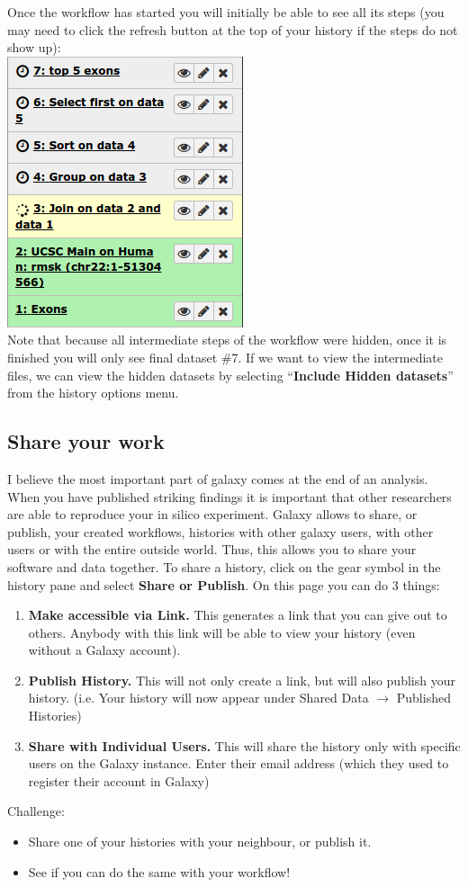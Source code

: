 \documentclass[11pt,a4paper]{article}
\begin{document}
Once the workflow has started you will initially be able to see all its steps (you may need to click the refresh button at the top of your history if the steps do not show up):\\
\includegraphics[scale=0.55]{figures/101_39}\\
Note that because all intermediate steps of the workflow were hidden, once it is finished you will only see final dataset \#7. If we want to view the intermediate files, we can view the hidden datasets by selecting ``\textbf{Include Hidden datasets}'' from the history options menu.
\subsection{Share your work}
I believe the most important part of galaxy comes at the end of an analysis. When you have published striking findings it is important that other researchers are able to reproduce your in silico experiment. Galaxy allows to share, or publish, your created workflows, histories with other galaxy users, with other users or with the entire outside world. Thus, this allows you to share your software and data together. To share a history, click on the gear symbol in the history pane and select \textbf{Share or Publish}. On this page you can do 3 things:
\begin{enumerate}
	\item \textbf{Make accessible via Link.} This generates a link that you can give out to others. Anybody with this link will be able to view your history (even without a Galaxy account).
	\item \textbf{Publish History.} This will not only create a link, but will also publish your history. (i.e. Your history will now appear
 under Shared Data $\rightarrow$ Published Histories)
	\item \textbf{Share with Individual Users.} This will share the history only with specific users on the Galaxy instance. Enter their email address (which they used to register their account in Galaxy)
\end{enumerate}

Challenge:
\begin{itemize}
	\item Share one of your histories with your neighbour, or publish it.
	\item See if you can do the same with your workflow!
\end{itemize}

%
%


\vspace{-1.5em}

\end{document}
